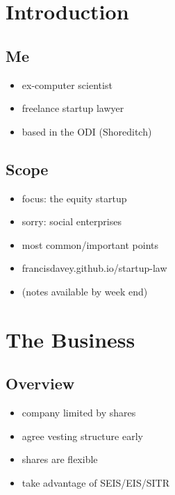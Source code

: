 \section{Introduction}\label{introduction}

\subsection{Me}\label{me}

\begin{itemize}
\itemsep1pt\parskip0pt
\item
  ex-computer scientist
\item
  freelance startup lawyer
\item
  based in the ODI (Shoreditch)
\end{itemize}

\subsection{Scope}\label{scope}

\begin{itemize}
\itemsep1pt\parskip0pt
\item
  focus: the equity startup
\item
  sorry: social enterprises
\item
  most common/important points
\item
  francisdavey.github.io/startup-law
\item
  (notes available by week end)
\end{itemize}

\section{The Business}\label{the-business}

\subsection{Overview}\label{overview}

\begin{itemize}
\itemsep1pt\parskip0pt
\item
  company limited by shares
\item
  agree vesting structure early
\item
  shares are flexible
\item
  take advantage of SEIS/EIS/SITR
\end{itemize}

